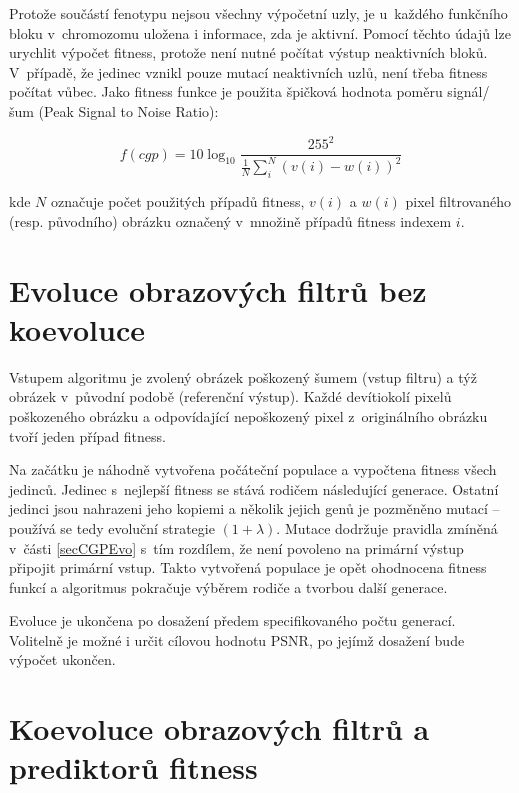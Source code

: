 Protože součástí fenotypu nejsou všechny výpočetní uzly, je u~každého funkčního bloku v~chromozomu uložena i informace, zda je aktivní. Pomocí těchto údajů lze urychlit výpočet fitness, protože není nutné počítat výstup neaktivních bloků. V~případě, že jedinec vznikl pouze mutací neaktivních uzlů, není třeba fitness počítat vůbec. Jako fitness funkce je použita špičková hodnota poměru signál/šum (Peak Signal to Noise Ratio):

\begin{equation}
    \label{eqDesignFilterFitness}
    \mathit{f\left(cgp\right)} = 10 \log_{10} \frac{255^2}{\frac{1}{N} \sum\limits_i^N \left( v\left( i \right) - w\left( i \right)  \right)^2 }
\end{equation}

\noindent{}kde $N$ označuje počet použitých případů fitness, $v(i)$ a $w(i)$ pixel filtrovaného (resp. původního) obrázku označený v~množině případů fitness indexem $i$.

\section{Evoluce obrazových filtrů bez koevoluce}
\label{secDesignEvoSimple}

Vstupem algoritmu je zvolený obrázek poškozený šumem (vstup filtru) a týž obrázek v~původní podobě (referenční výstup). Každé devítiokolí pixelů poškozeného obrázku a odpovídající nepoškozený pixel z~originálního obrázku tvoří jeden případ fitness.

Na začátku je náhodně vytvořena počáteční populace a vypočtena fitness všech jedinců. Jedinec s~nejlepší fitness se stává rodičem následující generace. Ostatní jedinci jsou nahrazeni jeho kopiemi a několik jejich genů je pozměněno mutací -- používá se tedy evoluční strategie $(1 + \lambda)$. Mutace dodržuje pravidla zmíněná v~části \ref{secCGPEvo} s~tím rozdílem, že není povoleno na primární výstup připojit primární vstup. Takto vytvořená populace je opět ohodnocena fitness funkcí a algoritmus pokračuje výběrem rodiče a tvorbou další generace.

Evoluce je ukončena po dosažení předem specifikovaného počtu generací. Volitelně je možné i určit cílovou hodnotu PSNR, po jejímž dosažení bude výpočet ukončen.



\section{Koevoluce obrazových filtrů a prediktorů fitness}
\label{secDesignCoev}

